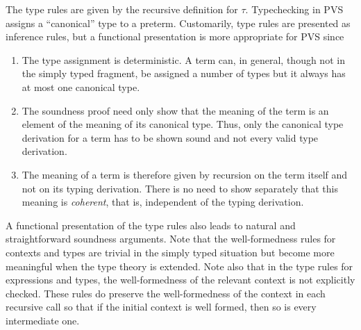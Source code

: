 \documentclass [12pt,twoside]{cslreport}
\begin{document}
The type rules are given by the recursive definition for $\tau$\@.
Typechecking in PVS assigns a ``canonical'' type to a preterm.
Customarily, type rules are presented as inference rules, but
a functional presentation is more appropriate for PVS since
\begin{enumerate}
\item The type assignment is deterministic.  A term can, in
general, though not in the simply typed fragment,  be assigned
a number of types but it always has at most one canonical type.  

\item The soundness proof need only show that the meaning of the term
is an element of the meaning of its canonical type.  Thus, only
the canonical type derivation for a term has to be shown sound and not
every valid type derivation. 

\item The meaning of a term is therefore given by recursion on the term
itself and not on its typing derivation.  There is no need to show
separately that this meaning is {\em coherent\/}, that is, independent of
the typing derivation.
\end{enumerate}
  A functional presentation of the type rules also
leads to natural and straightforward soundness arguments.  
Note that the well-formedness rules for contexts and types are trivial
in the simply typed situation but become more meaningful when the type
theory is extended.  Note also that in the type rules for expressions and
types, the well-formedness of the relevant context is not explicitly
checked.  These rules do preserve the well-formedness of the context
in each recursive call so that if the initial context is well formed, then
so is every intermediate one.    
\end{document}
